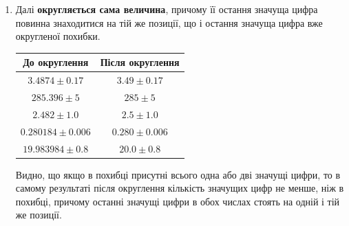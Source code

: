 \documentclass{LabBook}
\begin{document}
\begin{enumerate}
	\item Далі \textbf{округляється сама величина}, причому її остання значуща цифра повинна знаходитися на тій же позиції, що і остання значуща цифра вже округленої похибки.
	      \begin{center}
		      \begin{tabular}{cc}
			      \toprule
			      До округлення      & Після округлення \\ \midrule
			      $3.4874\pm0.17$    & $3.49\pm0.17$    \\
			      $285.396\pm5$      & $285\pm5$        \\
			      $2.482\pm1.0$      & $2.5\pm1.0$      \\
			      $0.280184\pm0.006$ & $0.280\pm0.006$  \\
			      $19.983984\pm0.8$  & $20.0\pm0.8$     \\ \bottomrule
		      \end{tabular}
	      \end{center}

	      Видно, що якщо в похибці присутні всього одна або дві значущі цифри, то в самому результаті після округлення кількість значущих цифр не менше, ніж в похибці, причому останні значущі цифри в обох числах стоять на одній і тій же позиції.


\end{enumerate}
\end{document}
